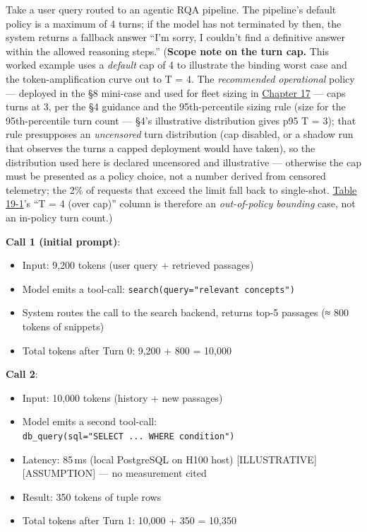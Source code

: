 \label{worked-example}


Take a user query routed to an agentic RQA pipeline. The pipeline's
default policy is a maximum of 4 turns; if the model has not terminated
by then, the system returns a fallback answer ``I'm sorry, I couldn't
find a definitive answer within the allowed reasoning steps.''
(\textbf{Scope note on the turn cap.} This worked example uses a
\emph{default} cap of 4 to illustrate the binding worst case and the
token-amplification curve out to T = 4. The \emph{recommended
operational} policy --- deployed in the §8 mini-case and used for fleet
sizing in \hyperref[chap:17]{Chapter 17} --- caps turns at 3, per the §4 guidance and the
95th-percentile sizing rule (size for the 95th-percentile turn count ---
§4's illustrative distribution gives p95 T = 3); that rule presupposes
an \emph{uncensored} turn distribution (cap disabled, or a shadow run
that observes the turns a capped deployment would have taken), so the
distribution used here is declared uncensored and illustrative ---
otherwise the cap must be presented as a policy choice, not a number
derived from censored telemetry; the 2\% of requests that exceed the
limit fall back to single-shot. \hyperref[tab:19.1]{Table 19-1}'s ``T = 4 (over cap)'' column
is therefore an \emph{out-of-policy bounding} case, not an in-policy
turn count.)

\textbf{Call 1 (initial prompt)}:

\begin{itemize}
\tightlist
\item
  Input: 9,200 tokens (user query + retrieved passages)
\item
  Model emits a tool-call: \texttt{search(query="relevant\ concepts")}
\item
  System routes the call to the search backend, returns top-5 passages
  (≈ 800 tokens of snippets)
\item
  Total tokens after Turn 0: 9,200 + 800 = 10,000
\end{itemize}

\textbf{Call 2}:

\begin{itemize}
\tightlist
\item
  Input: 10,000 tokens (history + new passages)
\item
  Model emits a second tool-call:
  \texttt{db\_query(sql="SELECT\ ...\ WHERE\ condition")}
\item
  Latency: 85\,ms (local PostgreSQL on H100 host)
  \mbox{{[}ILLUSTRATIVE{]}}\hspace{0pt}\mbox{{[}ASSUMPTION{]}} --- no measurement cited
\item
  Result: 350 tokens of tuple rows
\item
  Total tokens after Turn 1: 10,000 + 350 = 10,350
\end{itemize}

